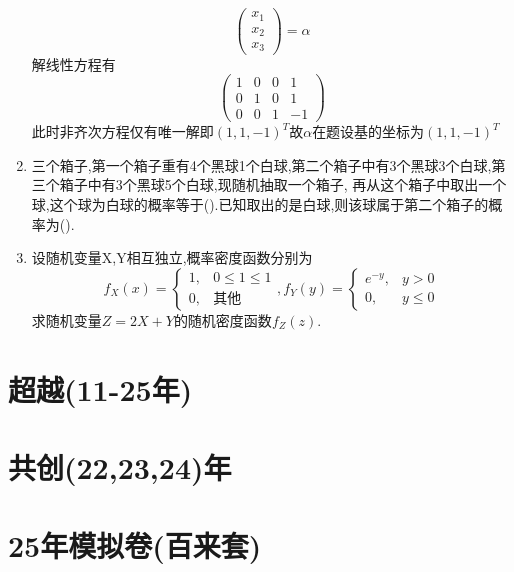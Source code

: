 \documentclass[12pt, a4paper, oneside, UTF8]{ctexbook}
\begin{document}
\begin{enumerate}
\begin{solution}
$$\begin{pmatrix}
            x_1 \\
            x_2 \\
            x_3
        \end{pmatrix} = \alpha
        $$
        解线性方程有
        $$
        \begin{pmatrix}
            1 & 0 & 0 & 1\\
            0 & 1 & 0 & 1\\
            0 & 0 & 1 & -1
        \end{pmatrix}
        $$
        此时非齐次方程仅有唯一解即$(1,1,-1)^{T}$故$\alpha$在题设基的坐标为$(1,1,-1)^T$
    \end{solution}
    \item 三个箱子,第一个箱子重有4个黑球1个白球,第二个箱子中有3个黑球3个白球,第三个箱子中有3个黑球5个白球,现随机抽取一个箱子,
    再从这个箱子中取出一个球,这个球为白球的概率等于(\qquad).已知取出的是白球,则该球属于第二个箱子的概率为(\qquad).

    \begin{solution}
        
    \end{solution}
    \item 设随机变量X,Y相互独立,概率密度函数分别为
    $$
    f_{X}(x)=\begin{cases}
        1, &0\leq 1\leq 1 \\
        0, &\text{其他}
    \end{cases},f_{Y}(y)=\begin{cases}
        e^{-y}, &y>0 \\
        0, &y\leq 0
    \end{cases}
    $$
    求随机变量$Z=2X+Y$的随机密度函数$f_{Z}(z)$.
\end{enumerate}

\newpage
\section{超越(11-25年)}

\newpage
\section{共创(22,23,24)年}

\newpage
\section{25年模拟卷(百来套)}

\ifx\allfiles\undefined
\end{document}
